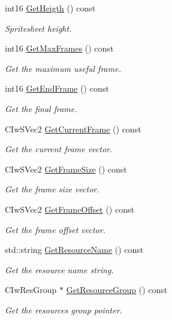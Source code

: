 \begin{DoxyCompactItemize}
int16 \hyperlink{class_c_ty_sprite_aadd1909ace834f91455b0736c9f7a77f}{GetHeigth} () const 
\begin{DoxyCompactList}\small\item\em Spritesheet height. \end{DoxyCompactList}\item 
int16 \hyperlink{class_c_ty_sprite_aab9a2d33ca126dfcecb9c227ba341b35}{GetMaxFrames} () const 
\begin{DoxyCompactList}\small\item\em Get the maximum useful frame. \end{DoxyCompactList}\item 
int16 \hyperlink{class_c_ty_sprite_a2dbf197c643f0b10d00cfb603412c541}{GetEndFrame} () const 
\begin{DoxyCompactList}\small\item\em Get the final frame. \end{DoxyCompactList}\item 
CIwSVec2 \hyperlink{class_c_ty_sprite_a88db8e1f73aac6d4dd9b808854c4ded9}{GetCurrentFrame} () const 
\begin{DoxyCompactList}\small\item\em Get the current frame vector. \end{DoxyCompactList}\item 
CIwSVec2 \hyperlink{class_c_ty_sprite_a08e983e98709a53553f67845ca186f87}{GetFrameSize} () const 
\begin{DoxyCompactList}\small\item\em Get the frame size vector. \end{DoxyCompactList}\item 
CIwSVec2 \hyperlink{class_c_ty_sprite_aa5aee4e95d225591fada060e6822e943}{GetFrameOffset} () const 
\begin{DoxyCompactList}\small\item\em Get the frame offset vector. \end{DoxyCompactList}\item 
std::string \hyperlink{class_c_ty_sprite_a7a7f52cdeded57d25aa6517cde03e804}{GetResourceName} () const 
\begin{DoxyCompactList}\small\item\em Get the resource name string. \end{DoxyCompactList}\item 
CIwResGroup $\ast$ \hyperlink{class_c_ty_sprite_a4577bd62cc7580972c01f2c67e9934a0}{GetResourceGroup} () const 
\begin{DoxyCompactList}\small\item\em Get the resources group pointer. \end{DoxyCompactList}\item 

\end{DoxyCompactItemize}
